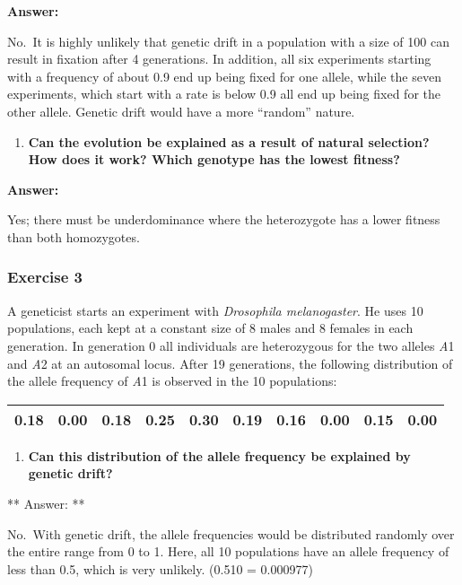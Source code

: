 \documentclass[]{article}
\providecommand{\tightlist}{%
  \setlength{\itemsep}{0pt}\setlength{\parskip}{0pt}}
\begin{document}
\textbf{Answer:}

No.~It is highly unlikely that genetic drift in a population with a size
of 100 can result in fixation after 4 generations. In addition, all six
experiments starting with a frequency of about 0.9 end up being fixed
for one allele, while the seven experiments, which start with a rate is
below 0.9 all end up being fixed for the other allele. Genetic drift
would have a more ``random'' nature.

\begin{enumerate}
\def\labelenumi{\arabic{enumi})}
\setcounter{enumi}{1}
\tightlist
\item
  \textbf{Can the evolution be explained as a result of natural
  selection? How does it work? Which genotype has the lowest fitness?}
\end{enumerate}

\textbf{Answer:}

Yes; there must be underdominance where the heterozygote has a lower
fitness than both homozygotes.

\hypertarget{exercise-3}{%
\subsubsection{Exercise 3}\label{exercise-3}}

A geneticist starts an experiment with \emph{Drosophila melanogaster}.
He uses 10 populations, each kept at a constant size of 8 males and 8
females in each generation. In generation 0 all individuals are
heterozygous for the two alleles \emph{A}1 and \emph{A}2 at an autosomal
locus. After 19 generations, the following distribution of the allele
frequency of \emph{A}1 is observed in the 10 populations:

\begin{longtable}[]{@{}llllllllll@{}}
\toprule
0.18 & 0.00 & 0.18 & 0.25 & 0.30 & 0.19 & 0.16 & 0.00 & 0.15 &
0.00\tabularnewline
\midrule
\endhead
\bottomrule
\end{longtable}

\begin{enumerate}
\def\labelenumi{\arabic{enumi})}
\tightlist
\item
  \textbf{Can this distribution of the allele frequency be explained by
  genetic drift?}
\end{enumerate}

** Answer: **

No.~With genetic drift, the allele frequencies would be distributed
randomly over the entire range from 0 to 1. Here, all 10 populations
have an allele frequency of less than 0.5, which is very unlikely.
(0.510 = 0.000977)
\end{document}
